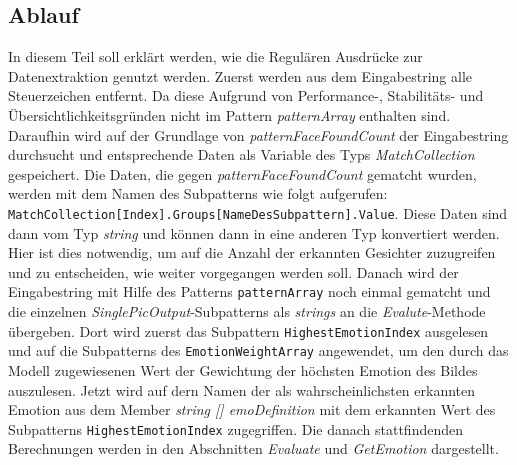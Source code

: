 \documentclass[10pt,a4paper]{report}
\begin{document}
\subsection{Ablauf}
In diesem Teil soll erklärt werden, wie die Regulären Ausdrücke zur Datenextraktion genutzt werden. Zuerst werden aus dem Eingabestring alle Steuerzeichen entfernt. Da diese Aufgrund
 von Performance-, Stabilitäts- und Übersichtlichkeitsgründen nicht im Pattern \textit{patternArray} enthalten sind. Daraufhin wird auf der Grundlage von \textit{patternFaceFoundCount}
 der Eingabestring durchsucht und entsprechende Daten als Variable des Typs \textit{MatchCollection} gespeichert. Die Daten, die gegen \textit{patternFaceFoundCount} gematcht wurden, werden mit dem Namen
 des Subpatterns wie folgt aufgerufen: \texttt{MatchCollection[Index].Groups[NameDesSubpattern].Value}. Diese Daten sind dann vom Typ \textit{string} und können dann in eine anderen Typ konvertiert werden. Hier ist dies notwendig, um auf die Anzahl der erkannten Gesichter zuzugreifen und zu entscheiden, wie weiter vorgegangen werden soll.
 Danach wird der Eingabestring mit Hilfe des Patterns \texttt{patternArray} noch einmal gematcht und die einzelnen \textit{SinglePicOutput}-Subpatterns als \textit{strings} an die \textit{Evalute}-Methode übergeben. Dort wird zuerst das Subpattern \texttt{HighestEmotionIndex} ausgelesen und auf die Subpatterns des \texttt{EmotionWeightArray} angewendet, um den durch das Modell zugewiesenen Wert der Gewichtung der höchsten Emotion des Bildes auszulesen. Jetzt wird auf dern Namen der als wahrscheinlichsten erkannten Emotion aus dem Member \textit{string [] emoDefinition} mit dem erkannten Wert des Subpatterns \texttt{HighestEmotionIndex} zugegriffen. Die danach stattfindenden Berechnungen werden in den Abschnitten \textit{Evaluate} und \textit{GetEmotion} dargestellt. 




%
\end{document}

